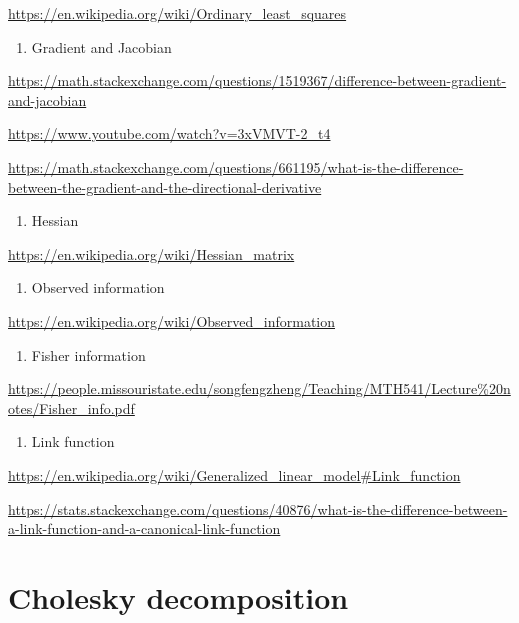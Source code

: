 \documentclass[
]{book}
\providecommand{\tightlist}{%
  \setlength{\itemsep}{0pt}\setlength{\parskip}{0pt}}
\begin{document}
\url{https://en.wikipedia.org/wiki/Ordinary_least_squares}

\begin{enumerate}
\def\labelenumi{\arabic{enumi}.}
\setcounter{enumi}{3}
\tightlist
\item
  Gradient and Jacobian
\end{enumerate}

\url{https://math.stackexchange.com/questions/1519367/difference-between-gradient-and-jacobian}

\url{https://www.youtube.com/watch?v=3xVMVT-2_t4}

\url{https://math.stackexchange.com/questions/661195/what-is-the-difference-between-the-gradient-and-the-directional-derivative}

\begin{enumerate}
\def\labelenumi{\arabic{enumi}.}
\setcounter{enumi}{4}
\tightlist
\item
  Hessian
\end{enumerate}

\url{https://en.wikipedia.org/wiki/Hessian_matrix}

\begin{enumerate}
\def\labelenumi{\arabic{enumi}.}
\setcounter{enumi}{5}
\tightlist
\item
  Observed information
\end{enumerate}

\url{https://en.wikipedia.org/wiki/Observed_information}

\begin{enumerate}
\def\labelenumi{\arabic{enumi}.}
\setcounter{enumi}{6}
\tightlist
\item
  Fisher information
\end{enumerate}

\url{https://people.missouristate.edu/songfengzheng/Teaching/MTH541/Lecture\%20notes/Fisher_info.pdf}

\begin{enumerate}
\def\labelenumi{\arabic{enumi}.}
\setcounter{enumi}{7}
\tightlist
\item
  Link function
\end{enumerate}

\url{https://en.wikipedia.org/wiki/Generalized_linear_model\#Link_function}

\url{https://stats.stackexchange.com/questions/40876/what-is-the-difference-between-a-link-function-and-a-canonical-link-function}

\hypertarget{cholesky-decomposition}{%
\chapter{Cholesky decomposition}\label{cholesky-decomposition}}
\end{document}
